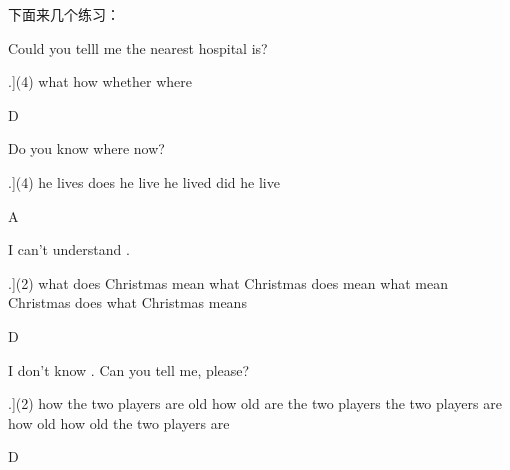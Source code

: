 \documentclass[a4paper]{article}
\begin{document}
下面来几个练习：

\begin{question}
Could you telll me \blank[width=1cm]{} the nearest hospital is?

   \begin{tasks}[counter-format=tsk[A].](4)
              \task what
              \task how
              \task whether
              \task where
   \end{tasks}
\end{question}
\begin{solution}
D
\end{solution}

\begin{question}
Do you know where \blank[width=1cm]{} now?

   \begin{tasks}[counter-format=tsk[A].](4)
              \task he lives
              \task does he live
              \task he lived
              \task did he live
   \end{tasks}
\end{question}
\begin{solution}
A
\end{solution}

\begin{question}
I can't understand \blank[width=3cm]{}.

   \begin{tasks}[counter-format=tsk[A].](2)
              \task what does Christmas mean
              \task what Christmas does mean
              \task what mean Christmas does
              \task what Christmas means
   \end{tasks}
\end{question}
\begin{solution}
D
\end{solution}

\begin{question}
I don't know \blank[width=2cm]{}. Can you tell me, please?

   \begin{tasks}[counter-format=tsk[A].](2)
              \task how the two players are old
              \task how old are the two players
              \task the two players are how old
              \task how old the two players are
   \end{tasks}
\end{question}
\begin{solution}
D
\end{solution}
\end{document}

